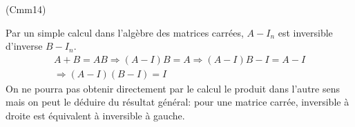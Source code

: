 \begin{tiny}(Cmm14)\end{tiny} Par un simple calcul dans l'algèbre des matrices carrées, $A-I_n$ est inversible d'inverse 
$B-I_n$. 
\begin{multline*}
  A+B = AB \Rightarrow (A-I)B=A \Rightarrow (A-I)B -I = A-I \\
  \Rightarrow (A-I)(B-I) = I
\end{multline*}
On ne pourra pas obtenir directement par le calcul le produit dans l'autre sens mais on peut le déduire du résultat général: pour une matrice carrée, inversible à droite est équivalent à inversible à gauche.